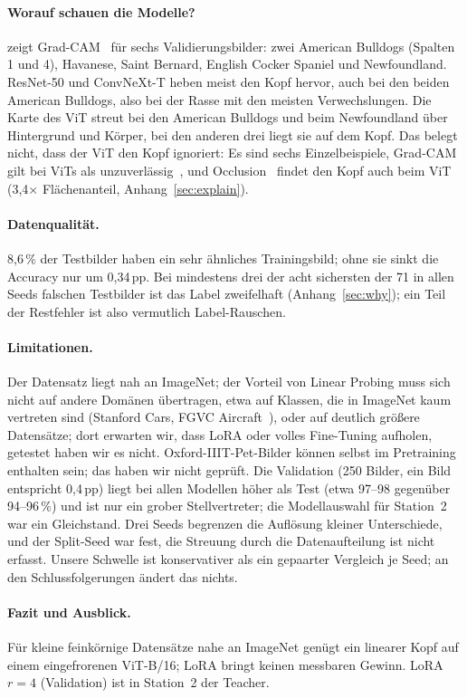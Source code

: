\paragraph{Worauf schauen die Modelle?}
 zeigt Grad-CAM~\cite{selvaraju2017gradcam} für sechs Validierungsbilder: zwei American Bulldogs (Spalten 1 und 4), Havanese,
Saint Bernard, English Cocker Spaniel und Newfoundland. ResNet-50 und ConvNeXt-T heben meist den Kopf hervor, auch bei
den beiden American Bulldogs, also bei der Rasse mit den meisten Verwechslungen. Die Karte des ViT streut bei den
American Bulldogs und beim Newfoundland über Hintergrund und Körper, bei den anderen drei liegt sie auf dem Kopf. Das belegt nicht, dass der ViT den Kopf ignoriert: Es sind sechs Einzelbeispiele, Grad-CAM gilt bei
ViTs als unzuverlässig~\cite{chefer2021transformer}, und Occlusion~\cite{zeiler2014visualizing} findet den Kopf auch beim ViT (3,4$\times$ Flächenanteil, Anhang~\ref{sec:explain}).

\paragraph{Datenqualität.}
8,6\,\% der Testbilder haben ein sehr ähnliches Trainingsbild; ohne sie sinkt die Accuracy nur um 0,34\,pp. Bei mindestens
drei der acht sichersten der 71 in allen Seeds falschen Testbilder ist das Label zweifelhaft (Anhang~\ref{sec:why}); ein Teil
der Restfehler ist also vermutlich Label-Rauschen.

\paragraph{Limitationen.}
Der Datensatz liegt nah an ImageNet; der Vorteil von Linear Probing muss sich nicht auf andere Domänen
übertragen, etwa auf Klassen, die in ImageNet kaum vertreten sind (Stanford Cars, FGVC Aircraft~\cite{kornblith2019transfer}),
oder auf deutlich größere Datensätze; dort erwarten wir, dass LoRA oder volles Fine-Tuning aufholen, getestet haben wir es nicht.
Oxford-IIIT-Pet-Bilder können selbst im Pretraining enthalten sein; das haben wir nicht geprüft. Die Validation
(250 Bilder, ein Bild entspricht 0,4\,pp) liegt bei allen Modellen höher als Test (etwa 97--98 gegenüber 94--96\,\%) und
ist nur ein grober Stellvertreter; die Modellauswahl für Station~2 war ein Gleichstand. Drei Seeds begrenzen die Auflösung kleiner
Unterschiede, und der Split-Seed war fest, die Streuung durch die Datenaufteilung ist nicht erfasst.
Unsere Schwelle ist konservativer als ein gepaarter Vergleich je Seed; an den Schlussfolgerungen ändert das nichts.

\paragraph{Fazit und Ausblick.}
Für kleine feinkörnige Datensätze nahe an ImageNet genügt ein linearer Kopf auf einem eingefrorenen
ViT-B/16; LoRA bringt keinen messbaren Gewinn. LoRA $r=4$ (Validation) ist in Station~2 der Teacher.
